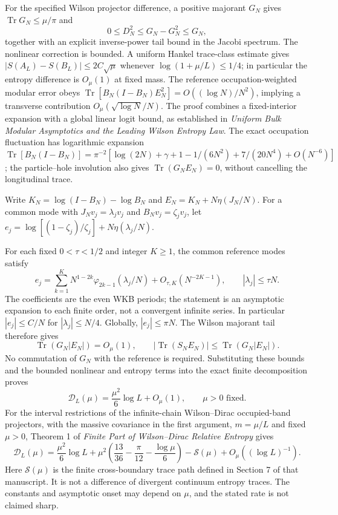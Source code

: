 \documentclass[
  10pt,
  a4paper,
]{article}
\begin{document}
For the specified Wilson projector difference, a positive majorant \(G_N\) gives \(\operatorname{Tr}G_N\le\mu/\pi\) and \[
0\le D_N^2\le G_N-G_N^2\le G_N,
\] together with an explicit inverse-power tail bound in the Jacobi spectrum. The nonlinear correction is bounded. A uniform Hankel trace-class estimate gives \(|S(A_L)-S(B_L)|\le 2C\sqrt\mu\) whenever \(\log(1+\mu/L)\le1/4\); in particular the entropy difference is \(O_\mu(1)\) at fixed mass. The reference occupation-weighted modular error obeys \(\operatorname{Tr}[B_N(I-B_N)E_N^2]=O((\log N)/N^2)\), implying a transverse contribution \(O_\mu(\sqrt{\log N}/N)\). The proof combines a fixed-interior expansion with a global linear logit bound, as established in \emph{Uniform Bulk Modular Asymptotics and the Leading Wilson Entropy Law}. The exact occupation fluctuation has logarithmic expansion \(\operatorname{Tr}[B_N(I-B_N)]=\pi^{-2}[\log(2N)+\gamma+1-1/(6N^2)+7/(20N^4)+O(N^{-6})]\); the particle--hole involution also gives \(\operatorname{Tr}(G_NE_N)=0\), without cancelling the longitudinal trace.

Write \(K_N=\log(I-B_N)-\log B_N\) and \(E_N=K_N+N\eta(J_N/N)\). For a common mode with \(J_Nv_j=\lambda_jv_j\) and \(B_Nv_j=\zeta_jv_j\), let \(e_j=\log[(1-\zeta_j)/\zeta_j]+N\eta(\lambda_j/N)\).

For each fixed \(0<\tau<1/2\) and integer \(K\ge1\), the common reference modes satisfy \[
e_j=\sum_{k=1}^K N^{1-2k}\varphi_{2k-1}(\lambda_j/N)
+O_{\tau,K}(N^{-2K-1}),\qquad |\lambda_j|\le\tau N.
\] The coefficients are the even WKB periods; the statement is an asymptotic expansion to each finite order, not a convergent infinite series. In particular \(|e_j|\le C/N\) for \(|\lambda_j|\le N/4\). Globally, \(|e_j|\le\pi N\). The Wilson majorant tail therefore gives \[
\operatorname{Tr}(G_N|E_N|)=O_\mu(1),\qquad
|\operatorname{Tr}(S_NE_N)|\le\operatorname{Tr}(G_N|E_N|).
\] No commutation of \(G_N\) with the reference is required. Substituting these bounds and the bounded nonlinear and entropy terms into the exact finite decomposition proves \[
\boxed{\mathcal D_L(\mu)=\frac{\mu^2}{6}\log L+O_\mu(1),\qquad \mu>0\text{ fixed}.}
\] For the interval restrictions of the infinite-chain Wilson--Dirac occupied-band projectors, with the massive covariance in the first argument, \(m=\mu/L\) and fixed \(\mu>0\), Theorem 1 of \emph{Finite Part of Wilson--Dirac Relative Entropy} gives \[\mathcal D_L(\mu)=\frac{\mu^2}{6}\log L+\mu^2\left(\frac{13}{36}-\frac{\pi}{12}-\frac{\log\mu}{6}\right)-\mathcal S(\mu)+O_\mu((\log L)^{-1}).\] Here \(\mathcal S(\mu)\) is the finite cross-boundary trace path defined in Section 7 of that manuscript. It is not a difference of divergent continuum entropy traces. The constants and asymptotic onset may depend on \(\mu\), and the stated rate is not claimed sharp.
\end{document}
